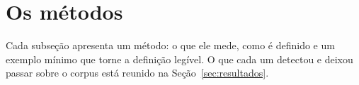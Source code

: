 \section{Os métodos}
\label{sec:metodos}

\indent\indent Cada subseção apresenta um método: o que ele mede, como é definido e um exemplo mínimo que
torne a definição legível. O que cada um detectou e deixou passar sobre o corpus está reunido
na Seção~\ref{sec:resultados}.














